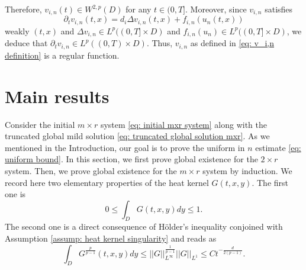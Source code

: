 \documentclass[12pt]{article}
\theoremstyle{definition}
\theoremstyle{remark}
\begin{document}
Therefore, $v_{i,n}(t) \in W^{2,p}(D)$ for any $t\in (0,T]$. Moreover, since $v_{i,n}$ satisfies
\[
\partial_t v_{i,n}(t,x)= d_i\Delta v_{i,n}(t,x) + f_{i,n}(u_n(t,x))
\]
weakly $(t,x)$ and $\Delta v_{i,n}\in L^p((0,T]\times D)$ and $f_{i,n}(u_n)\in L^p( (0,T]\times D)$, we deduce that $\partial_t v_{i,n} \in L^p((0,T)\times D)$. Thus, $v_{i,n}$ as defined in \eqref{eq: v_i,n definition} is a regular function.
\section{Main results}\label{section: Main results}
Consider the initial $m\times r$ system \eqref{eq: initial mxr system} along with the truncated global mild solution \eqref{eq: truncated global solution mxr}. As we mentioned in the Introduction, our goal is to prove the uniform in $n$ estimate \eqref{eq: uniform bound}. In this section, we first prove global existence for the $2\times r$ system. Then, we prove global existence for the $m\times r$ system by induction. We record here two elementary properties of the heat kernel $G(t,x,y)$. The first one is
\begin{equation}\label{eq: int of heat kernel <= 1}
    0\leq \int_D G(t,x,y) dy \leq 1.
\end{equation}
The second one is a direct consequence of H\"older's inequality conjoined with Assumption \ref{assump: heat kernel singularity} and reads as
\begin{equation}\label{eq: Heat kernel bound G^p/p-1}
\int_D G^{\frac{p}{p-1}}(t,x,y)dy \leq ||G||_{L^{\infty}}^{\frac{1}{p-1}}||G||_{L^1}\leq Ct^{-\frac{d}{2(p-1)}}.
\end{equation}
\end{document}
